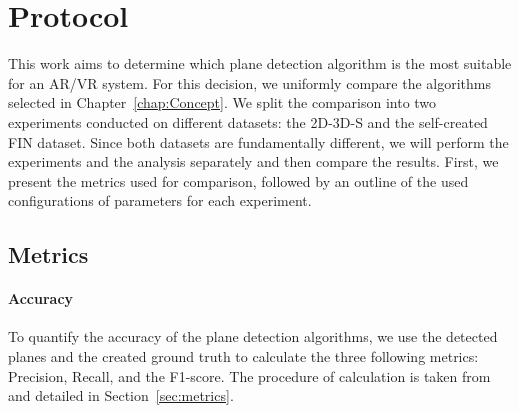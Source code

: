 \documentclass[main.tex]{subfiles}
\begin{document}
\section{Protocol}
This work aims to determine which plane detection algorithm is the most suitable for an AR/VR system. For this decision, we uniformly compare the algorithms selected in
Chapter~\ref{chap:Concept}. We split the comparison into two experiments conducted on different datasets: the 2D-3D-S and the
self-created FIN dataset. Since both datasets are fundamentally different, we will perform the experiments and the analysis separately and then compare the results.
First, we present the metrics used for comparison, followed by an outline of the used configurations of parameters for each experiment.

\subsection{Metrics}
\label{subsec:metrics}
\paragraph{Accuracy}
To quantify the accuracy of the plane detection algorithms, we use the detected planes and the created ground truth to calculate the three following
metrics: Precision, Recall, and the F1-score. The procedure of calculation is taken from~\cite[Section~4]{Araújo_Oliveira_2020} and detailed
in Section~\ref{sec:metrics}.
\end{document}
